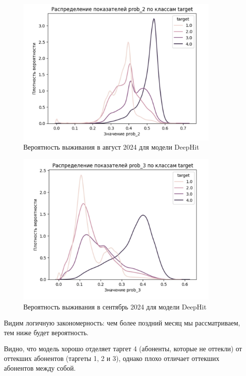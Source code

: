 \documentclass[a4paper,14pt,oneside,openany]{memoir}
\begin{document}
\begin{figure}[H]
	\includegraphics[width=0.9\textwidth]{../figures/prob_2_deephit.png}
	\caption{Вероятность выживания в август 2024 для модели DeepHit}
\end{figure}

\begin{figure}[H]
	\includegraphics[width=0.9\textwidth]{../figures/prob_3_deephit.png}
	\caption{Вероятность выживания в сентябрь 2024 для модели DeepHit}
\end{figure}

Видим логичную закономерность: чем более поздний месяц мы рассматриваем, тем ниже будет вероятность. 

Видно, что модель хорошо отделяет таргет 4 (абоненты, которые не оттекли) от оттекших абонентов (таргеты 1, 2 и 3), однако плохо отличает оттекших абонентов между собой. 
\end{document}
